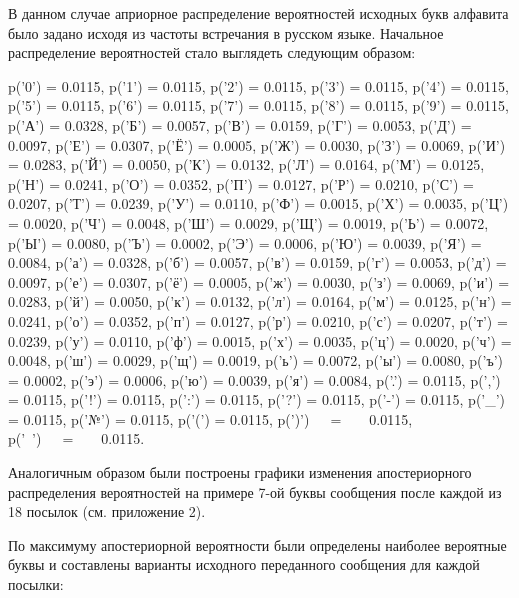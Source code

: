 В данном случае априорное распределение вероятностей исходных букв алфавита было задано исходя из частоты встречания в русском языке. Начальное распределение вероятностей стало выглядеть следующим образом:

{ \scriptsize
\begin{multicols}{6}
\noindent p('0') = 0.0115,	p('1') = 0.0115,	p('2') = 0.0115,	p('3') = 0.0115,	p('4') = 0.0115,	p('5') = 0.0115,	p('6') = 0.0115,	p('7') = 0.0115,	p('8') = 0.0115,	p('9') = 0.0115,	p('А') = 0.0328,	p('Б') = 0.0057,	p('В') = 0.0159,	p('Г') = 0.0053,	p('Д') = 0.0097,	p('Е') = 0.0307,	p('Ё') = 0.0005,	p('Ж') = 0.0030,	p('З') = 0.0069,	p('И') = 0.0283,	p('Й') = 0.0050,	p('К') = 0.0132,	p('Л') = 0.0164,	p('М') = 0.0125,	p('Н') = 0.0241,	p('О') = 0.0352,	p('П') = 0.0127,	p('Р') = 0.0210,	p('С') = 0.0207,	p('Т') = 0.0239,	p('У') = 0.0110,	p('Ф') = 0.0015,	p('Х') = 0.0035,	p('Ц') = 0.0020,	p('Ч') = 0.0048,	p('Ш') = 0.0029,	p('Щ') = 0.0019,	p('Ь') = 0.0072,	p('Ы') = 0.0080,	p('Ъ') = 0.0002,	p('Э') = 0.0006,	p('Ю') = 0.0039,	p('Я') = 0.0084,	p('а') = 0.0328,	p('б') = 0.0057,	p('в') = 0.0159,	p('г') = 0.0053,	p('д') = 0.0097,	p('е') = 0.0307,	p('ё') = 0.0005,	p('ж') = 0.0030,	p('з') = 0.0069,	p('и') = 0.0283,	p('й') = 0.0050,	p('к') = 0.0132,	p('л') = 0.0164,	p('м') = 0.0125,	p('н') = 0.0241,	p('о') = 0.0352,	p('п') = 0.0127,	p('р') = 0.0210,	p('с') = 0.0207,	p('т') = 0.0239,	p('у') = 0.0110,	p('ф') = 0.0015,	p('х') = 0.0035,	p('ц') = 0.0020,	p('ч') = 0.0048,	p('ш') = 0.0029,	p('щ') = 0.0019,	p('ь') = 0.0072,	p('ы') = 0.0080,	p('ъ') = 0.0002,	p('э') = 0.0006,	p('ю') = 0.0039,	p('я') = 0.0084,	p('.') = 0.0115,	p(',') = 0.0115,	p('!') = 0.0115,	p(':') = 0.0115,	p('?') = 0.0115,	p('-') = 0.0115,	p('\_') = 0.0115,	p('№') = 0.0115,	p('(') = 0.0115,	p(')')\ \ \ =\ \ \ \ 0.0115,\\	p('\ ')\ \ \ =\ \ \ \ 0.0115.
\end{multicols}

}

Аналогичным образом были построены графики изменения апостериорного распределения вероятностей на примере 7-ой буквы сообщения после каждой из 18 посылок (см. приложение 2).

По максимуму апостериорной вероятности были определены наиболее вероятные буквы и составлены варианты исходного переданного сообщения для каждой посылки:


